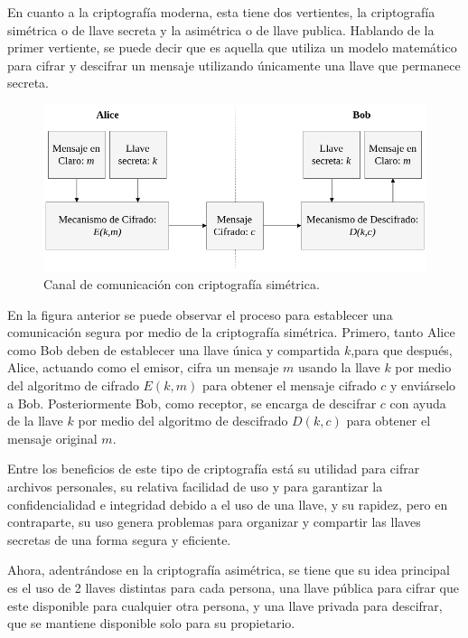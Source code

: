     En cuanto a la criptografía moderna, esta tiene dos vertientes, la
    criptografía simétrica o de llave secreta y la asimétrica o de llave
    publica. Hablando de la primer vertiente, se puede decir que es aquella
    que utiliza un modelo matemático para cifrar y descifrar un mensaje
    utilizando únicamente una llave que permanece secreta.

    \begin{figure}[H]
      \begin{center}
        \includegraphics[width=0.8\linewidth]
          {contenidos/antecedentes/intro_img/cripto_simetrica.png}
        \caption{Canal de comunicación con criptografía simétrica.}
      \end{center}
    \end{figure}

    En la figura anterior se puede observar el proceso para establecer una
    comunicación segura por medio de la criptografía simétrica. Primero, tanto
    Alice como Bob deben de establecer una llave única y compartida $k$,para
    que después, Alice, actuando como el emisor, cifra un mensaje $m$ usando
    la llave $k$ por medio del algoritmo de cifrado $E(k,m)$ para obtener el
    mensaje cifrado $c$ y enviárselo a Bob. Posteriormente Bob, como receptor,
    se encarga de descifrar $c$ con ayuda de la llave $k$ por medio del
    algoritmo de descifrado $D(k,c)$ para obtener el mensaje original $m$.

    Entre los beneficios de este tipo de criptografía está su utilidad para
    cifrar archivos personales, su relativa facilidad de uso y para garantizar
    la confidencialidad e integridad debido a el uso de una llave, y su
    rapidez, pero en contraparte, su uso genera problemas para organizar y
    compartir las llaves secretas de una forma segura y eficiente.

    Ahora, adentrándose en la criptografía asimétrica, se tiene que su idea
    principal es el uso de 2 llaves distintas para cada persona, una llave
    pública para cifrar que este disponible para cualquier otra persona, y una
    llave privada para descifrar, que se mantiene disponible solo para su
    propietario.

